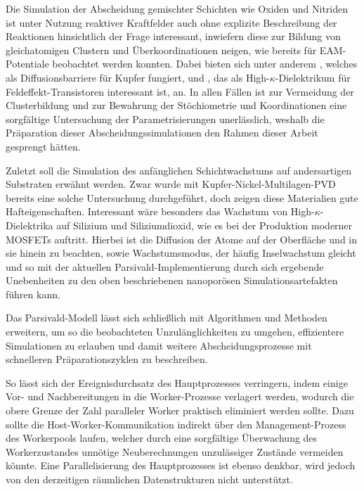 Die Simulation der Abscheidung gemischter Schichten wie Oxiden und Nitriden ist unter Nutzung reaktiver Kraftfelder auch ohne explizite Beschreibung der Reaktionen hinsichtlich der Frage interessant, inwiefern diese zur Bildung von gleichatomigen Clustern und Überkoordinationen neigen, wie bereits für EAM-Potentiale beobachtet werden konnten\cite{lorenz_entwicklung_2012}.
Dabei bieten sich unter anderem , welches als Diffusionsbarriere für Kupfer fungiert, und , das als High-$\kappa$-Dielektrikum für Feldeffekt-Transistoren interessant ist, an.
In allen Fällen ist zur Vermeidung der Clusterbildung und zur Bewahrung der Stöchiometrie und Koordinationen eine sorgfältige Untersuchung der Parametrisierungen unerlässlich, weshalb die Präparation dieser Abscheidungssimulationen den Rahmen dieser Arbeit gesprengt hätten.

Zuletzt soll die Simulation des anfänglichen Schichtwachstums auf andersartigen Substraten erwähnt werden.
Zwar wurde mit Kupfer-Nickel-Multilagen-PVD bereits eine solche Untersuchung durchgeführt, doch zeigen diese Materialien gute Hafteigenschaften.
Interessant wäre besonders das Wachstum von High-$\kappa$-Dielektrika auf Silizium und Siliziumdioxid, wie es bei der Produktion moderner MOSFETs auftritt.
Hierbei ist die Diffusion der Atome auf der Oberfläche und in sie hinein zu beachten, sowie Wachstumsmodus, der häufig Inselwachstum gleicht und so mit der aktuellen Parsivald-Implementierung durch sich ergebende Unebenheiten zu den oben beschriebenen nanoporösen Simulationsartefakten führen kann.

\vspace{0.5em}

Das Parsivald-Modell lässt sich schließlich mit Algorithmen und Methoden erweitern, um so die beobachteten Unzulänglichkeiten zu umgehen, effizientere Simulationen zu erlauben und damit weitere Abscheidungsprozesse mit schnelleren Präparationszyklen zu beschreiben.

So lässt sich der Ereignisdurchsatz des Hauptprozesses verringern, indem einige Vor- und Nachbereitungen in die Worker-Prozesse verlagert werden, wodurch die obere Grenze der Zahl paralleler Worker praktisch eliminiert werden sollte.
Dazu sollte die Host-\-Worker-\-Kom\-mu\-ni\-ka\-tion indirekt über den Management-Prozess des Workerpools laufen, welcher durch eine sorgfältige Überwachung des Workerzustandes unnötige Neuberechnungen unzulässiger Zustände vermeiden könnte.
Eine Parallelisierung des Hauptprozesses ist ebenso denkbar, wird jedoch von den derzeitigen räumlichen Datenstrukturen nicht unterstützt.

